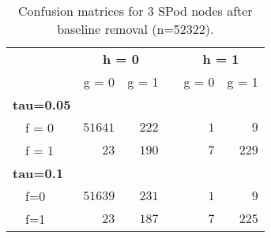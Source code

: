 \begin{table}[!tbp]
\caption{Confusion matrices for 3 SPod nodes after baseline removal (n=52322).\label{conf}} 
\begin{center}
\begin{tabular}{lrrcrr}
\hline\hline
\multicolumn{1}{l}{\bfseries }&\multicolumn{2}{c}{\bfseries h = 0}&\multicolumn{1}{c}{\bfseries }&\multicolumn{2}{c}{\bfseries h = 1}\tabularnewline
\cline{2-3} \cline{5-6}
\multicolumn{1}{l}{}&\multicolumn{1}{c}{g = 0}&\multicolumn{1}{c}{g = 1}&\multicolumn{1}{c}{}&\multicolumn{1}{c}{g = 0}&\multicolumn{1}{c}{g = 1}\tabularnewline
\hline
{\bfseries tau=0.05}&&&&&\tabularnewline
~~f = 0&$51641$&$222$&&$1$&$  9$\tabularnewline
~~f = 1&$   23$&$190$&&$7$&$229$\tabularnewline
\hline
{\bfseries tau=0.1}&&&&&\tabularnewline
~~f=0&$51639$&$231$&&$1$&$  9$\tabularnewline
~~f=1&$   23$&$187$&&$7$&$225$\tabularnewline
\hline
\end{tabular}\end{center}
\end{table}
